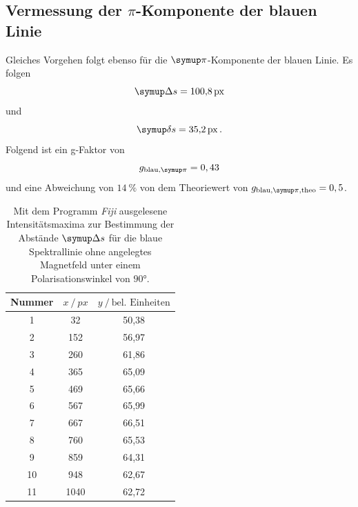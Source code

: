\subsection{Vermessung der \texorpdfstring{$\pi$}{pi}-Komponente der blauen Linie}
Gleiches Vorgehen folgt ebenso für die $\pii$-Komponente der blauen Linie.
Es folgen
\begin{equation}
  \Deltaup s=\SI{100,8}{px}
\end{equation}
und
\begin{equation}
  \deltaup s=\SI{35,2}{px}\,.
\end{equation}
Folgend ist ein g-Faktor von
\begin{equation}
  g_{\text{blau},\pii}=0,43
\end{equation}
und eine Abweichung von $\SI{14}{\%}$ von dem Theoriewert von $g_{\text{blau},\pii,\text{theo}}=0,5$.
\begin{table}[H]
  \centering
  \caption{Mit dem Programm \textit{Fiji} \cite{Fiji} ausgelesene Intensitätsmaxima zur Bestimmung der Abstände $\Deltaup s$ für die blaue Spektrallinie ohne angelegtes Magnetfeld unter einem Polarisationswinkel von $90°$.}
  \label{tab:piblau0mT}
  \begin{tabular}{c|cc}
    \toprule
    {Nummer} & {$x \:/\: \si{px}$} & {$y \:/\: \text{bel. Einheiten}$}\\
    \midrule
 1 &  32   &	 50,38 \\
 2 &  152  &	 56,97 \\
 3 &  260  &	 61,86 \\
 4 &  365  &	 65,09 \\
 5 &  469  &	 65,66 \\
 6 &  567  &	 65,99 \\
 7 &  667  &	 66,51 \\
 8 &  760  &	 65,53\\
 9 &  859  &   64,31 \\
10 &  948  &	 62,67 \\
11 &  1040  &	 62,72 \\
  \end{tabular}
\end{table}

